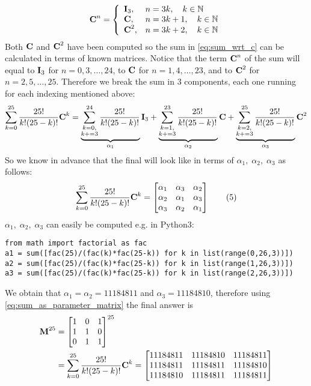 \documentclass[a4paper]{article}
\begin{document}
\[ 
\textbf{C}^n = \left\{
\begin{array}{ll}
    \textbf{I}_3, & n = 3k, \quad k \in \mathbb{N}\\
    \textbf{C}, & n = 3k+1, \quad k \in \mathbb{N}\\
    \textbf{C}^2, & n = 3k+2, \quad k \in \mathbb{N}\\
\end{array} 
\right. 
\]
Both $\textbf{C}$ and $\textbf{C}^2$ have been computed so the sum in \eqref{eq:sum_wrt_c} can be calculated in terms of known matrices. Notice that the term $\textbf{C}^n$ of the sum will equal to $\textbf{I}_3$ for $n=0,3,\ldots,24$, to $\textbf{C}$ for $n=1,4,\ldots,23$, and to $\textbf{C}^2$ for $n=2,5,\ldots,25$. Therefore we break the sum in 3 components, each one running for each indexing mentioned above:
\[
    \sum_{k=0}^{25}\frac{25!}{k!(25-k)!}\textbf{C}^k =
    \underbrace{\sum_{\substack{k=0, \\ k+=3}}^{24}\frac{25!}{k!(25-k)!}}_{\alpha_1}\textbf{I}_3 +
    \underbrace{\sum_{\substack{k=1, \\ k+=3}}^{23}\frac{25!}{k!(25-k)!}}_{\alpha_2}\textbf{C} +
    \underbrace{\sum_{\substack{k=2, \\ k+=3}}^{25}\frac{25!}{k!(25-k)!}}_{\alpha_3}\textbf{C}^2
\]
So we know in advance that the final will look like in terms of $\alpha_1,\; \alpha_2, \; \alpha_3$ as follows:
\[
     \sum_{k=0}^{25}\frac{25!}{k!(25-k)!}\textbf{C}^k = 
     \begin{bmatrix}
         \alpha_1 & \alpha_3 & \alpha_2\\
         \alpha_2 & \alpha_1 & \alpha_3 \\
         \alpha_3 & \alpha_2 & \alpha_1
     \end{bmatrix}
     \label{eq:sum_as_parameter_matrix}
     \tag{5}
\]
$\alpha_1,\; \alpha_2,\; \alpha_3$ can easily be computed e.g. in Python3:
\begin{verbatim}
from math import factorial as fac
a1 = sum([fac(25)/(fac(k)*fac(25-k)) for k in list(range(0,26,3))])
a2 = sum([fac(25)/(fac(k)*fac(25-k)) for k in list(range(1,26,3))])
a3 = sum([fac(25)/(fac(k)*fac(25-k)) for k in list(range(2,26,3))])
\end{verbatim}
We obtain that $\alpha_1 = \alpha_2 = 11184811$ and $\alpha_3 = 11184810$, therefore using \eqref{eq:sum_as_parameter_matrix} the final answer is
\begin{align*}
      \textbf{M}^{25} &= 
     \begin{bmatrix}
        1 & 0 & 1\\
        1 & 1 & 0\\
        0 & 1 & 1
    \end{bmatrix}^{25}  \\
     &=\sum_{k=0}^{25}\frac{25!}{k!(25-k)!}\textbf{C}^k = 
     \begin{bmatrix}
         11184811 & 11184810 & 11184811\\
         11184811 & 11184811 & 11184810 \\
         11184810 & 11184811 & 11184811
     \end{bmatrix}   
\end{align*}
\end{document}
